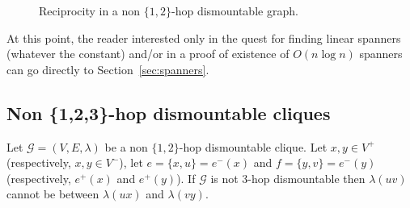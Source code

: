 \documentclass[USenglish, a4paper, thm-restate,numberwithinsect, cleveref]{lipics-v2021}
\newcommand{\G}{\ensuremath{\mathcal{G}}\xspace}
\begin{document}
\begin{figure}[h]
    \centering

    \caption{Reciprocity in a non $\{1,2\}$-hop dismountable graph.}
    \label{fig:reciprocity}
\end{figure}

At this point, the reader interested only in the quest for finding linear spanners (whatever the constant) and/or in a proof of existence of $O(n \log n)$ spanners can go directly to Section~\ref{sec:spanners}.

\subsection{Non \{1,2,3\}-hop dismountable cliques}


\begin{lemma}\label{lemma10}
    Let $\G=(V,E,\lambda)$ be a non $\{1,2\}$-hop dismountable clique. Let $x,y\in V^+$ (respectively, $x,y\in V^-$), let $e=\{x,u\}=e^-(x)$ and $f=\{y,v\}=e^-(y)$ (respectively, $e^+(x)$ and $e^+(y)$). If $\G$ is not 3-hop dismountable then $\lambda(uv)$ cannot be between $\lambda(ux)$ and $\lambda(vy)$.
\end{lemma}
\end{document}
